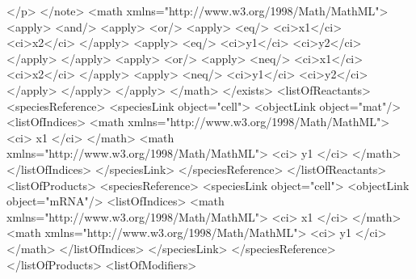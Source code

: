 \documentclass{cekarticle}
\begin{document}
\begin{example}
                    </p>
                </note>                
                <math xmlns="http://www.w3.org/1998/Math/MathML">
                    <apply>
                        <and/>
                        <apply>
                            <or/>
                            <apply>
                                <eq/>
                                <ci>x1</ci>
                                <ci>x2</ci>
                            </apply>
                            <apply>
                                <eq/>
                                <ci>y1</ci>
                                <ci>y2</ci>
                            </apply>
                        </apply>
                        <apply>
                            <or/>
                            <apply>
                                <neq/>
                                <ci>x1</ci>
                                <ci>x2</ci>
                            </apply>
                            <apply>
                                <neq/>
                                <ci>y1</ci>
                                <ci>y2</ci>
                            </apply>
                        </apply>
                    </apply>
                </math>
            </exists>
            <listOfReactants>
                <speciesReference>
                    <speciesLink object="cell">
                        <objectLink object="mat"/>
                        <listOfIndices>
                            <math xmlns="http://www.w3.org/1998/Math/MathML">
                                <ci> x1 </ci>
                            </math>
                            <math xmlns="http://www.w3.org/1998/Math/MathML">
                                <ci> y1 </ci>
                            </math>
                        </listOfIndices>
                    </speciesLink>
                </speciesReference>
            </listOfReactants>
            <listOfProducts>
                <speciesReference>
                    <speciesLink object="cell">
                        <objectLink object="mRNA"/>
                        <listOfIndices>
                            <math xmlns="http://www.w3.org/1998/Math/MathML">
                                <ci> x1 </ci>
                            </math>
                            <math xmlns="http://www.w3.org/1998/Math/MathML">
                                <ci> y1 </ci>
                            </math>
                        </listOfIndices>
                    </speciesLink>
                </speciesReference>
            </listOfProducts>
            <listOfModifiers>

\end{example}
\end{document}
